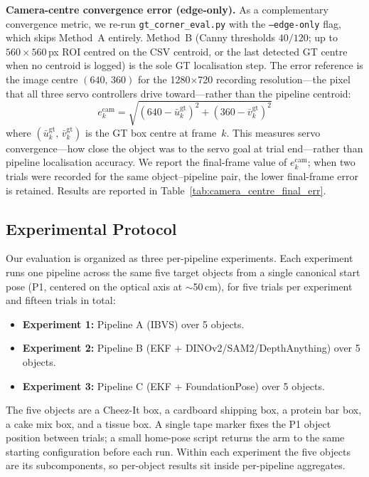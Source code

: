 \documentclass[letterpaper, 10 pt, conference]{ieeeconf}  %
\begin{document}
\textbf{Camera-centre convergence error (edge-only).}
As a complementary convergence metric, we re-run \texttt{gt\_corner\_eval.py} with the \texttt{--edge-only} flag, which skips Method~A entirely. Method~B (Canny thresholds $40/120$; up to $560\times560$\,px ROI centred on the CSV centroid, or the last detected GT centre when no centroid is logged) is the sole GT localisation step. The error reference is the image centre $(640,\,360)$ for the 1280$\times$720 recording resolution---the pixel that all three servo controllers drive toward---rather than the pipeline centroid:
\begin{equation}
e_k^{\mathrm{cam}} = \sqrt{(640 - \bar{u}_k^{\mathrm{gt}})^2 + (360 - \bar{v}_k^{\mathrm{gt}})^2}
\label{eq:cam_centre_err}
\end{equation}
where $(\bar{u}_k^{\mathrm{gt}},\,\bar{v}_k^{\mathrm{gt}})$ is the GT box centre at frame~$k$. This measures servo convergence---how close the object was to the servo goal at trial end---rather than pipeline localisation accuracy. We report the final-frame value of $e_k^{\mathrm{cam}}$; when two trials were recorded for the same object--pipeline pair, the lower final-frame error is retained. Results are reported in Table~\ref{tab:camera_centre_final_err}.

\subsection{Experimental Protocol}

Our evaluation is organized as three per-pipeline experiments. Each experiment runs one pipeline across the same five target objects from a single canonical start pose (P1, centered on the optical axis at $\sim$50\,cm), for five trials per experiment and fifteen trials in total:
\begin{itemize}
\item \textbf{Experiment 1:} Pipeline A (IBVS) over 5 objects.
\item \textbf{Experiment 2:} Pipeline B (EKF + DINOv2/SAM2/DepthAnything) over 5 objects.
\item \textbf{Experiment 3:} Pipeline C (EKF + FoundationPose) over 5 objects.
\end{itemize}
The five objects are a Cheez-It box, a cardboard shipping box, a protein bar box, a cake mix box, and a tissue box. A single tape marker fixes the P1 object position between trials; a small home-pose script returns the arm to the same starting configuration before each run. Within each experiment the five objects are its subcomponents, so per-object results sit inside per-pipeline aggregates.
\end{document}
